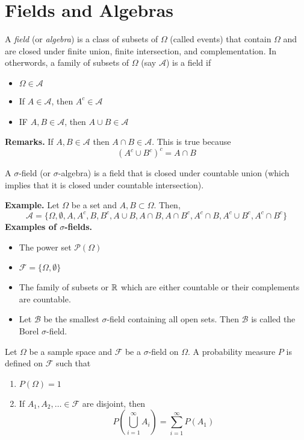 \documentclass[openany]{report}
\begin{document}
\section{Fields and Algebras}
\begin{definition}
    A \emph{field} (or \emph{algebra}) is a class of subsets of $\Omega$ (called events) that contain $\Omega$ and are closed under finite union, finite intersection, and complementation. In otherwords, a family of subsets of $\Omega$ (say $\mathcal{A}$) is a field if 
    \begin{itemize}
        \item $\Omega \in \mathcal{A}$
        \item If $A \in \mathcal{A}$, then $A^c \in \mathcal{A}$
        \item IF $A,B \in \mathcal{A}$, then $A \cup B \in \mathcal{A}$
    \end{itemize}
\end{definition}
\noindent
\textbf{Remarks.} If $A,B \in \mathcal{A}$ then $A \cap B \in \mathcal{A}$. This is true because 
\[(A^c \cup B^c)^c = A \cap B\]
\begin{definition}
    A $\sigma$-field (or $\sigma$-algebra) is a field that is closed under countable union (which implies that it is closed under countable intersection).
\end{definition}
\noindent
\textbf{Example.} Let $\Omega$ be a set and $A,B \subset \Omega$. Then, 
\[\mathcal{A} = \{\Omega, \emptyset, A, A^c, B, B^c, A\cup B, A \cap B, A \cap B^c, A^c \cap B, A^c \cup B^c, A^c \cap B^c\}\]
\textbf{Examples of $\sigma$-fields.}
\begin{itemize}
    \item The power set $\mathcal{P}(\Omega)$
    \item $\mathcal{F} = \{\Omega, \emptyset\}$
    \item The family of subsets or $\mathbb{R}$ which are either countable or their complements are countable. 
    \item Let $\mathcal{B}$ be the smallest $\sigma$-field containing all open sets. Then $\mathcal{B}$ is called the Borel $\sigma$-field.
\end{itemize}


\begin{definition}
    Let $\Omega$ be a sample space and $\mathcal{F}$ be a $\sigma$-field on $\Omega$. A probability measure $P$ is defined on $\mathcal{F}$ such that 
    \begin{enumerate}[label=(\roman*)]
        \item $P(\Omega) = 1$
        \item If $A_1, A_2, \ldots \in \mathcal{F}$ are disjoint, then 
        \[P\left(\bigcup_{i=1}^\infty A_i\right) = \sum_{i=1}^\infty P(A_1)\]
    \end{enumerate}
\end{definition}
\end{document}
